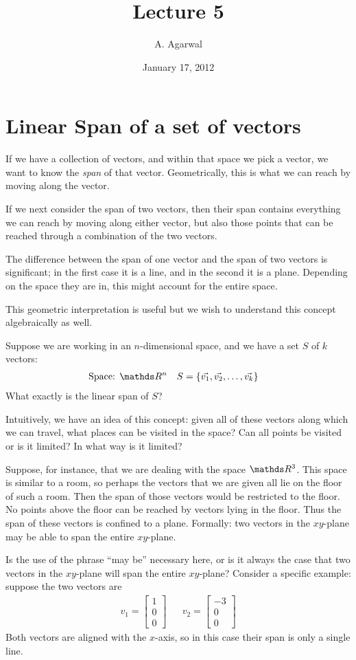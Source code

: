 \documentclass[11pt]{article}
\title{Lecture 5}
\author{A. Agarwal}
\date{January 17, 2012}
\begin{document}

\section*{Linear Span of a set of vectors}

If we have a collection of vectors, and within that space we pick a vector, we want to know the \emph{span} of that vector. Geometrically, this is what we can reach by moving along the vector.

If we next consider the span of two vectors, then their span contains everything we can reach by moving along either vector, but also those points that can be reached through a combination of the two vectors.

The difference between the span of one vector and the span of two vectors is significant; in the first case it is a line, and in the second it is a plane. Depending on the space they are in, this might account for the entire space.

This geometric interpretation is useful but we wish to understand this concept algebraically as well.

Suppose we are working in an $n$-dimensional space, and we have a set $S$ of $k$ vectors:
\begin{align*}
\text{Space: } & \bbR^n
&
S &= \left\{ \vec{v_1}, \vec{v_2}, \dots, \vec{v_k} \right\}
\end{align*}
What exactly is the linear span of $S$?

Intuitively, we have an idea of this concept: given all of these vectors along which we can travel, what places can be visited in the space? Can all points be visited or is it limited? In what way is it limited?

Suppose, for instance, that we are dealing with the space $\bbR^3$. This space is similar to a room, so perhaps the vectors that we are given all lie on the floor of such a room. Then the span of those vectors would be restricted to the floor. No points above the floor can be reached by vectors lying in the floor. Thus the span of these vectors is confined to a plane. Formally: two vectors in the $xy$-plane may be able to span the entire $xy$-plane.

Is the use of the phrase ``may be'' necessary here, or is it always the case that two vectors in the $xy$-plane will span the entire $xy$-plane? Consider a specific example: suppose the two vectors are
\begin{align*}
v_1 = \begin{bmatrix}1\\0\\0\end{bmatrix}
&&
v_2 = \begin{bmatrix}-3\\0\\0\end{bmatrix}
\end{align*}
Both vectors are aligned with the $x$-axis, so in this case their span is only a single line.
\end{document}
